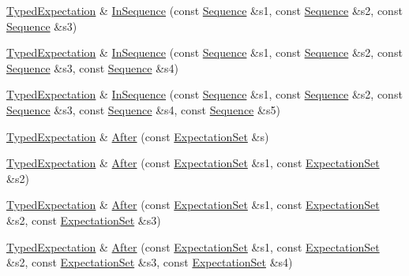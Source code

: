 \begin{DoxyCompactItemize}
\item 
\hyperlink{classtesting_1_1internal_1_1TypedExpectation}{Typed\+Expectation} \& \hyperlink{classtesting_1_1internal_1_1TypedExpectation_a17cfbb9db111e0ded254759664e78d73}{In\+Sequence} (const \hyperlink{classtesting_1_1Sequence}{Sequence} \&s1, const \hyperlink{classtesting_1_1Sequence}{Sequence} \&s2, const \hyperlink{classtesting_1_1Sequence}{Sequence} \&s3)
\item 
\hyperlink{classtesting_1_1internal_1_1TypedExpectation}{Typed\+Expectation} \& \hyperlink{classtesting_1_1internal_1_1TypedExpectation_aa60bae1cf536651dc5efcd8110bea4fd}{In\+Sequence} (const \hyperlink{classtesting_1_1Sequence}{Sequence} \&s1, const \hyperlink{classtesting_1_1Sequence}{Sequence} \&s2, const \hyperlink{classtesting_1_1Sequence}{Sequence} \&s3, const \hyperlink{classtesting_1_1Sequence}{Sequence} \&s4)
\item 
\hyperlink{classtesting_1_1internal_1_1TypedExpectation}{Typed\+Expectation} \& \hyperlink{classtesting_1_1internal_1_1TypedExpectation_ad8775f8ba9965d1836f6e4c09baf1c3e}{In\+Sequence} (const \hyperlink{classtesting_1_1Sequence}{Sequence} \&s1, const \hyperlink{classtesting_1_1Sequence}{Sequence} \&s2, const \hyperlink{classtesting_1_1Sequence}{Sequence} \&s3, const \hyperlink{classtesting_1_1Sequence}{Sequence} \&s4, const \hyperlink{classtesting_1_1Sequence}{Sequence} \&s5)
\item 
\hyperlink{classtesting_1_1internal_1_1TypedExpectation}{Typed\+Expectation} \& \hyperlink{classtesting_1_1internal_1_1TypedExpectation_a30f320d18ebf1a40e94883d7a56c6c8c}{After} (const \hyperlink{classtesting_1_1ExpectationSet}{Expectation\+Set} \&s)
\item 
\hyperlink{classtesting_1_1internal_1_1TypedExpectation}{Typed\+Expectation} \& \hyperlink{classtesting_1_1internal_1_1TypedExpectation_a8e272fc396e508a2e63b13be30f81f15}{After} (const \hyperlink{classtesting_1_1ExpectationSet}{Expectation\+Set} \&s1, const \hyperlink{classtesting_1_1ExpectationSet}{Expectation\+Set} \&s2)
\item 
\hyperlink{classtesting_1_1internal_1_1TypedExpectation}{Typed\+Expectation} \& \hyperlink{classtesting_1_1internal_1_1TypedExpectation_a95a341dd221901b5e51dd7cfdbdb3570}{After} (const \hyperlink{classtesting_1_1ExpectationSet}{Expectation\+Set} \&s1, const \hyperlink{classtesting_1_1ExpectationSet}{Expectation\+Set} \&s2, const \hyperlink{classtesting_1_1ExpectationSet}{Expectation\+Set} \&s3)
\item 
\hyperlink{classtesting_1_1internal_1_1TypedExpectation}{Typed\+Expectation} \& \hyperlink{classtesting_1_1internal_1_1TypedExpectation_a1749e368f659352ed8375512acafc178}{After} (const \hyperlink{classtesting_1_1ExpectationSet}{Expectation\+Set} \&s1, const \hyperlink{classtesting_1_1ExpectationSet}{Expectation\+Set} \&s2, const \hyperlink{classtesting_1_1ExpectationSet}{Expectation\+Set} \&s3, const \hyperlink{classtesting_1_1ExpectationSet}{Expectation\+Set} \&s4)

\end{DoxyCompactItemize}
